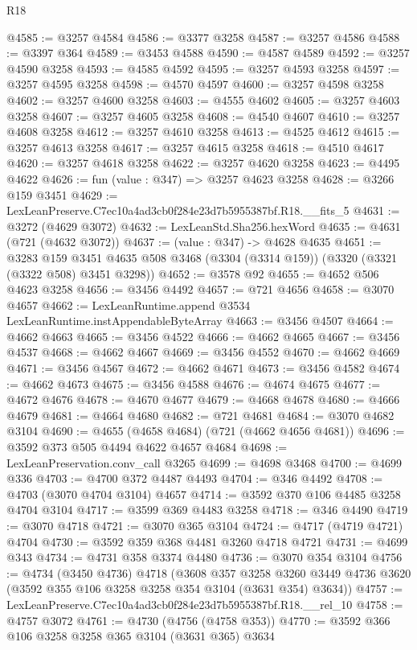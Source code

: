 \begin{lexlean}{R18}
\begin{coremodule}
@4585 := @3257 @4584
@4586 := @3377 @3258
@4587 := @3257 @4586
@4588 := @3397 @364
@4589 := @3453 @4588
@4590 := @4587 @4589
@4592 := @3257 @4590 @3258
@4593 := @4585 @4592
@4595 := @3257 @4593 @3258
@4597 := @3257 @4595 @3258
@4598 := @4570 @4597
@4600 := @3257 @4598 @3258
@4602 := @3257 @4600 @3258
@4603 := @4555 @4602
@4605 := @3257 @4603 @3258
@4607 := @3257 @4605 @3258
@4608 := @4540 @4607
@4610 := @3257 @4608 @3258
@4612 := @3257 @4610 @3258
@4613 := @4525 @4612
@4615 := @3257 @4613 @3258
@4617 := @3257 @4615 @3258
@4618 := @4510 @4617
@4620 := @3257 @4618 @3258
@4622 := @3257 @4620 @3258
@4623 := @4495 @4622
@4626 := fun (value : @347) => @3257 @4623 @3258
@4628 := @3266 @159 @3451
@4629 := LexLeanPreserve.C7ec10a4ad3cb0f284e23d7b5955387bf.R18.__fits_5
@4631 := @3272 (@4629 @3072)
@4632 := LexLeanStd.Sha256.hexWord
@4635 := @4631 (@721 (@4632 @3072))
@4637 := (value : @347) -> @4628 @4635
@4651 := @3283
    @159
    @3451
    @4635
    @508
    @3468
    (@3304 (@3314 @159))
    (@3320 (@3321 (@3322 @508) @3451 @3298))
@4652 := @3578 @92
@4655 := @4652 @506 @4623 @3258
@4656 := @3456 @4492
@4657 := @721 @4656
@4658 := @3070 @4657
@4662 := LexLeanRuntime.append @3534 LexLeanRuntime.instAppendableByteArray
@4663 := @3456 @4507
@4664 := @4662 @4663
@4665 := @3456 @4522
@4666 := @4662 @4665
@4667 := @3456 @4537
@4668 := @4662 @4667
@4669 := @3456 @4552
@4670 := @4662 @4669
@4671 := @3456 @4567
@4672 := @4662 @4671
@4673 := @3456 @4582
@4674 := @4662 @4673
@4675 := @3456 @4588
@4676 := @4674 @4675
@4677 := @4672 @4676
@4678 := @4670 @4677
@4679 := @4668 @4678
@4680 := @4666 @4679
@4681 := @4664 @4680
@4682 := @721 @4681
@4684 := @3070 @4682 @3104
@4690 := @4655 (@4658 @4684) (@721 (@4662 @4656 @4681))
@4696 := @3592 @373 @505 @4494 @4622 @4657 @4684
@4698 := LexLeanPreservation.conv_call @3265
@4699 := @4698 @3468
@4700 := @4699 @336
@4703 := @4700 @372 @4487 @4493
@4704 := @346 @4492
@4708 := @4703 (@3070 @4704 @3104) @4657
@4714 := @3592 @370 @106 @4485 @3258 @4704 @3104
@4717 := @3599 @369 @4483 @3258
@4718 := @346 @4490
@4719 := @3070 @4718
@4721 := @3070 @365 @3104
@4724 := @4717 (@4719 @4721) @4704
@4730 := @3592 @359 @368 @4481 @3260 @4718 @4721
@4731 := @4699 @343
@4734 := @4731 @358 @3374 @4480
@4736 := @3070 @354 @3104
@4756 := @4734
    (@3450 @4736)
    @4718
    (@3608
      @357
      @3258
      @3260
      @3449
      @4736
      @3620
      (@3592 @355 @106 @3258 @3258 @354 @3104 (@3631 @354) @3634))
@4757 := LexLeanPreserve.C7ec10a4ad3cb0f284e23d7b5955387bf.R18.__rel_10
@4758 := @4757 @3072
@4761 := @4730 (@4756 (@4758 @353))
@4770 := @3592 @366 @106 @3258 @3258 @365 @3104 (@3631 @365) @3634

\end{coremodule}
\end{lexlean}
